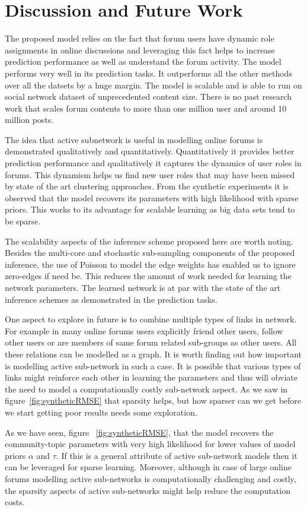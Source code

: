 \documentclass{sig-alternate}
\begin{document}
\section{Discussion and Future Work}
The  proposed model relies on the fact that forum users have dynamic role
assignments in online discussions and leveraging this fact helps to increase
prediction performance as well as understand the forum activity. The model
performs very well in its prediction tasks. It outperforms all the other methods
over all the datsets by a huge margin. The model is scalable and is able to run
on social network dataset of unprecedented content size. There is no past
research work that scales forum contents to more than one  million user and
around 10 million posts. 

The idea that active subnetwork is useful in modelling online forums is
demonstrated qualitatively and quantitatively. Quantitatively it provides better
prediction performance and qualitatively it captures the dynamics of user
roles in forums. This dynamism helps us find new user roles that may have
been missed by state of the art clustering approaches.
From the synthetic experiments it is observed that the model
recovers its parameters with high likelihood with sparse priors. This works to
its advantage for scalable learning as big data sets tend to be sparse.

The scalability aspects of the inference scheme proposed here are worth noting.
Besides the multi-core and stochastic sub-sampling components of the proposed
inference, the use of Poisson to model the edge weights has enabled us to 
ignore zero-edges if need be. This reduces the amount of work needed for
learning the network parameters. The learned network is at par with the state of the art
inference schemes as demonstrated in the prediction tasks.   

One aspect to explore in future is to combine multiple types of links in
network. For example in many online forums users explicitly friend other users,
follow other users or are members of same forum related sub-groups as other
users. All these relations can be modelled as a graph. It is worth finding out
how important is modelling active sub-network in such a case. It is
possible that various types of links might reinforce each other in learning
the parameters and thus will obviate the need to model a computationally
costly sub-network aspect. As we saw in figure~\ref{fig:syntheticRMSE} that
sparsity helps, but how sparser can we get before we start getting poor results
needs some exploration.

As we have
seen, figure ~\ref{fig:syntheticRMSE}, that the model recovers the
community-topic parameters with very high likelihood for lower values of model
priors $\alpha$ and $\tau$. If this is a general attribute of active sub-network
models then it can be leveraged for sparse learning. Moreover, although in case
of large online forums modelling active sub-networks is computationally
challenging and costly, the sparsity aspects of active sub-networks might help
reduce the computation costs.




\appendix

\end{document}
